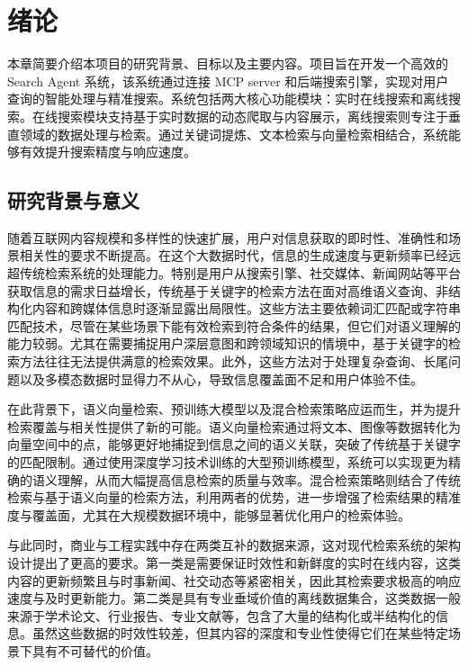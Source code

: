 \chapter{绪论}
本章简要介绍本项目的研究背景、目标以及主要内容。项目旨在开发一个高效的 Search Agent 系统，该系统通过连接 MCP server 和后端搜索引擎，实现对用户查询的智能处理与精准搜索。系统包括两大核心功能模块：实时在线搜索和离线搜索。在线搜索模块支持基于实时数据的动态爬取与内容展示，离线搜索则专注于垂直领域的数据处理与检索。通过关键词提炼、文本检索与向量检索相结合，系统能够有效提升搜索精度与响应速度。
\section{研究背景与意义}
 
随着互联网内容规模和多样性的快速扩展，用户对信息获取的即时性、准确性和场景相关性的要求不断提高。在这个大数据时代，信息的生成速度与更新频率已经远超传统检索系统的处理能力。特别是用户从搜索引擎、社交媒体、新闻网站等平台获取信息的需求日益增长，传统基于关键字的检索方法在面对高维语义查询、非结构化内容和跨媒体信息时逐渐显露出局限性\cite{mao2025comparativestudyretrievalmethods}。这些方法主要依赖词汇匹配或字符串匹配技术，尽管在某些场景下能有效检索到符合条件的结果，但它们对语义理解的能力较弱。尤其在需要捕捉用户深层意图和跨领域知识的情境中，基于关键字的检索方法往往无法提供满意的检索效果。此外，这些方法对于处理复杂查询、长尾问题以及多模态数据时显得力不从心，导致信息覆盖面不足和用户体验不佳。

在此背景下，语义向量检索、预训练大模型以及混合检索策略应运而生，并为提升检索覆盖与相关性提供了新的可能。语义向量检索通过将文本、图像等数据转化为向量空间中的点，能够更好地捕捉到信息之间的语义关联，突破了传统基于关键字的匹配限制。通过使用深度学习技术训练的大型预训练模型，系统可以实现更为精确的语义理解，从而大幅提高信息检索的质量与效率\cite{wang2025balancingblendexperimentalanalysis}。混合检索策略则结合了传统检索与基于语义向量的检索方法，利用两者的优势，进一步增强了检索结果的精准度与覆盖面，尤其在大规模数据环境中，能够显著优化用户的检索体验\cite{yang2025arcaderealtimedatahybrid}。

与此同时，商业与工程实践中存在两类互补的数据来源，这对现代检索系统的架构设计提出了更高的要求。第一类是需要保证时效性和新鲜度的实时在线内容，这类内容的更新频繁且与时事新闻、社交动态等紧密相关，因此其检索要求极高的响应速度与及时更新能力\cite{ALAKASHI2022}。第二类是具有专业垂域价值的离线数据集合，这类数据一般来源于学术论文、行业报告、专业文献等，包含了大量的结构化或半结构化的信息。虽然这些数据的时效性较差，但其内容的深度和专业性使得它们在某些特定场景下具有不可替代的价值。

